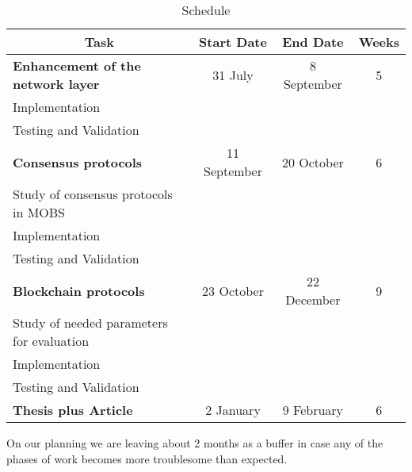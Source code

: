 \begin{table}[ht]
\centering
\caption{Schedule}
\label{tab:schedule}
\begin{tabular}{lccc}
  \toprule
  \multicolumn{1}{c}{\textbf{Task}}					& \textbf{Start Date} & \textbf{End Date} & \textbf{Weeks}	\\ 
  \midrule
  \textbf{Enhancement of the network layer}					& 31 July            & 8 September          & 5             	\\
  \quad Implementation 								&                     &                   &                	\\ 
  \quad Testing and Validation 								&                     &                   &                	\\
  \midrule
  \textbf{Consensus protocols}						& 11 September             & 20 October       & 6              	\\
  \quad Study of consensus protocols in MOBS 								&                     &                   &                	\\ 
  \quad Implementation 								&                     &                   &                	\\ 
  \quad Testing and Validation								&                     &                   &                	\\ 
  \midrule
  \textbf{Blockchain protocols}						& 23 October             & 22 December       & 9         	\\
  \quad Study of needed parameters for evaluation 								&                     &                   &                	\\ 
  \quad Implementation 								&                     &                   &                	\\ 
  \quad Testing and Validation								&                     &                   &                	\\ 
  \midrule
  \textbf{Thesis plus Article}									& 2 January           & 9 February      & 6          	  	\\   
  \bottomrule
\end{tabular}
\end{table}

On our planning we are leaving about 2 months as a buffer in case any of the
phases of work becomes more troublesome than expected.